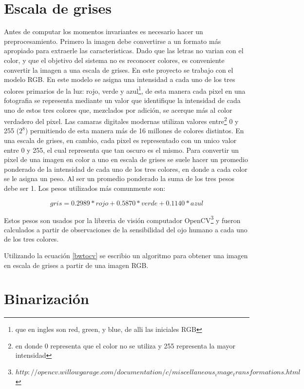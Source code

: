 \documentclass[a4paper, 11pt, oneside]{report}
\begin{document}
\section{Escala de grises}

Antes de computar los momentos invariantes es necesario hacer un preprocesamiento. Primero la imagen debe convertirse a un formato más apropiado para extraerle las caracteristicas. Dado que las letras no varian con el color, y que el objetivo del sistema no es reconocer colores, es conveniente convertir la imagen a una escala de grises. En este proyecto se trabajo con el modelo RGB. En este modelo se asigna una intensidad a cada uno de los tres colores primarios de la luz: rojo, verde y azul\footnote{que en ingles son red, green, y blue, de alli las iniciales RGB}, de esta manera cada pixel en una fotografia se representa mediante un valor que identifique la intensidad de cada uno de estos tres colores que, mezclados por adición, se acerque más al color verdadero del pixel. Las camaras digitales modernas utilizan valores entre\footnote{en donde 0 representa que el color no se utiliza y 255 representa la mayor intensidad} 0 y 255 ($2^8$) permitiendo de esta manera más de 16 millones de colores distintos. En una escala de grises, en cambio, cada pixel es representado con un unico valor entre 0 y 255, el cual representa que tan oscuro es el mismo. Para convertir un pixel de una imagen en color a uno en escala de grises se suele hacer un promedio ponderado de la intensidad de cada uno de los tres colores, en donde a cada color se le asigna un peso. Al ser un promedio ponderado la suma de los tres pesos debe ser 1. Los pesos utilizados más comunmente son:

\begin{equation}\label{bwtocv}
	gris = 0.2989 * rojo + 0.5870 * verde + 0.1140 * azul 
\end{equation}

Estos pesos son usados por la libreria de visión computador OpenCV\footnote{$http://opencv.willowgarage.com/documentation/c/miscellaneous_image_transformations.html$} y fueron calculados a partir de observaciones de la sensibilidad del ojo humano a cada uno de los tres colores. 

Utilizando la ecuación \eqref{bwtocv} se escribio un algoritmo para obtener una imagen en escala de grises a partir de una imagen RGB. 

\section{Binarización}
\end{document}
